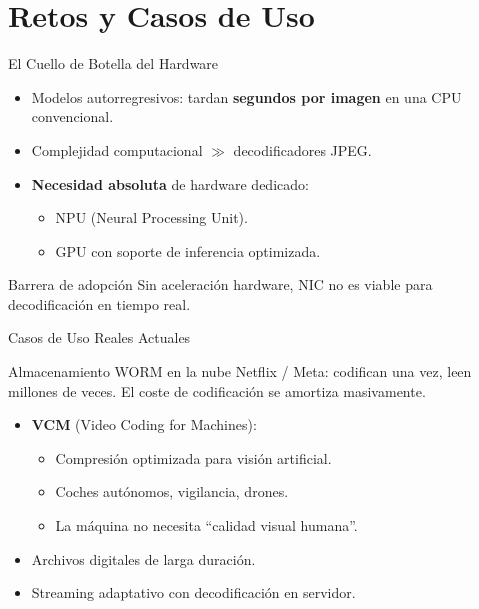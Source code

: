 \section{Retos y Casos de Uso}


\begin{frame}{El Cuello de Botella del Hardware}
\begin{itemize}
    \item Modelos autorregresivos: tardan \textbf{segundos por imagen} en una CPU convencional.
    \item Complejidad computacional $\gg$ decodificadores JPEG.
    \item \textbf{Necesidad absoluta} de hardware dedicado:
    \begin{itemize}
        \item NPU (Neural Processing Unit).
        \item GPU con soporte de inferencia optimizada.
    \end{itemize}
\end{itemize}
\begin{alertblock}{Barrera de adopción}
Sin aceleración hardware, NIC no es viable para decodificación en tiempo real.
\end{alertblock}
\end{frame}

\begin{frame}{Casos de Uso Reales Actuales}
\begin{exampleblock}{Almacenamiento WORM en la nube}
Netflix / Meta: codifican una vez, leen millones de veces. El coste de codificación se amortiza masivamente.
\end{exampleblock}
\begin{itemize}
    \item \textbf{VCM} (Video Coding for Machines):
    \begin{itemize}
        \item Compresión optimizada para visión artificial.
        \item Coches autónomos, vigilancia, drones.
        \item La máquina no necesita ``calidad visual humana''.
    \end{itemize}
    \item Archivos digitales de larga duración.
    \item Streaming adaptativo con decodificación en servidor.
\end{itemize}
\end{frame}

